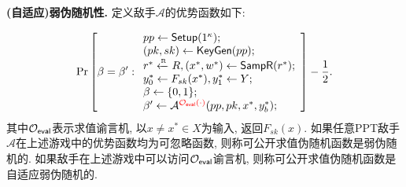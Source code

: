 \begin{trivlist}
\item \textbf{(自适应)弱伪随机性.} 定义敌手$\mathcal{A}$的优势函数如下: 

\begin{displaymath}
\Pr \left[\beta = \beta':   
    \begin{array}{l}
        pp \leftarrow \mathsf{Setup}(1^\kappa); \\
        (pk, sk) \leftarrow \mathsf{KeyGen}(pp);\\
        r^* \xleftarrow{\textup{\tiny R}} R, (x^*, w^*) \leftarrow \mathsf{SampR}(r^*);\\
        y_0^* \leftarrow F_{sk}(x^*), y_1^* \leftarrow Y;\\
        \beta \leftarrow \{0,1\};\\     
        \beta' \leftarrow \mathcal{A}^{{\color{red} \mathcal{O}_\mathsf{eval}(\cdot)}}(pp, pk, x^*, y_b^*);
    \end{array} 
\right] - \frac{1}{2}. 
\end{displaymath}
其中$\mathcal{O}_\mathsf{eval}$表示求值谕言机, 以$x \neq x^* \in X$为输入, 返回$F_{sk}(x)$.  
如果任意PPT敌手$\mathcal{A}$在上述游戏中的优势函数均为可忽略函数, 则称可公开求值伪随机函数是弱伪随机的. 
如果敌手在上述游戏中可以访问$\mathcal{O}_\mathsf{eval}$谕言机, 则称可公开求值伪随机函数是自适应弱伪随机的. 
\end{trivlist}

